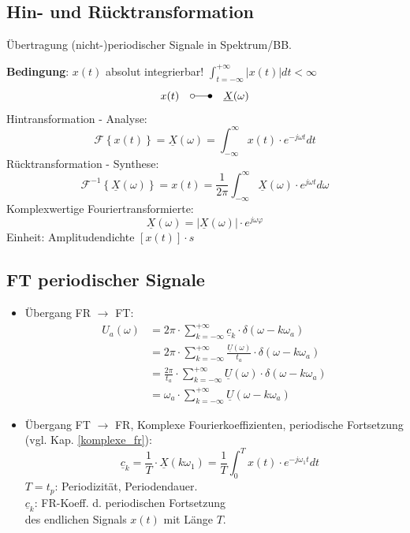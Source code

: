 \begin{multicols*}{2}
\subsection{Hin- und Rücktransformation}
{\small Übertragung (nicht-)periodischer Signale in Spektrum/BB.}\\
\begin{mdframed}[style=exercise]
	\small { \textbf{Bedingung}: $x(t)$ absolut integrierbar! $\int_{t=-\infty}^{+\infty}|x(t)|dt<\infty$ }
	\[
		x(t) \quad \laplace  \quad \underline{X}(\omega)
	\]
	Hintransformation - Analyse:
	\[
		\mathcal{F}\left\{ x(t) \right\} = \underline{X}(\omega) = \int_{-\infty}^{\infty} x(t) \cdot e^{-j\omega t} dt
	\]
	Rücktransformation - Synthese:
	\[
		 \mathcal{F}^{-1}\left\{ \underline{X}(\omega) \right\} = x(t) = \frac{1}{2\pi}\int_{-\infty}^{\infty} \underline{X}(\omega) \cdot e^{j\omega t} d\omega
	\]
	Komplexwertige Fouriertransformierte:
	\[
	\underline{X}(\omega) = |\underline{X}(\omega)|\cdot e^{j\omega\varphi}
	\]
	\footnotesize
	Einheit: Amplitudendichte $\left[ x(t) \right]\cdot s$
	\normalsize
	
\end{mdframed}

\subsection{FT periodischer Signale}\label{ft_periodischer_signale}
\begin{itemize}

	\item Übergang FR $\rightarrow$ FT:
\begin{align*}
	U_a(\omega) &= 2\pi \cdot \sum_{k=-\infty}^{+\infty} \underline{c}_k \cdot \delta(\omega-k\omega_a)\\
	& = 2\pi \cdot \sum_{k=-\infty}^{+\infty} \frac{\underline{U}(\omega)}{t_a} \cdot \delta(\omega-k\omega_a)\\
	&= \frac{2\pi}{t_a} \cdot \sum_{k=-\infty}^{+\infty} \underline{U}(\omega) \cdot \delta(\omega-k\omega_a) \\
	& =  \omega_a \cdot \sum_{k=-\infty}^{+\infty} \underline{U}(\omega-k\omega_a)
\end{align*}
	\item Übergang FT $\rightarrow$ FR, Komplexe Fourierkoeffizienten, periodische Fortsetzung (vgl. Kap. \ref{komplexe_fr}):
	\[ \boxed{
		\quad \underline{c}_k =
		\frac{1}{T} \cdot \underline{X}(k\omega_1) } =
		\frac{1}{T}\int_0^T x(t) \cdot e^{-j\omega_1 t} dt
	\]
	\small{$T=t_p$: Periodizität, Periodendauer.}\\
	\small{ $\underline{c}_k$: FR-Koeff. d. periodischen Fortsetzung \\des endlichen Signals $x(t)$ mit Länge $T$.}\\
	

\end{itemize}
\end{multicols*}
